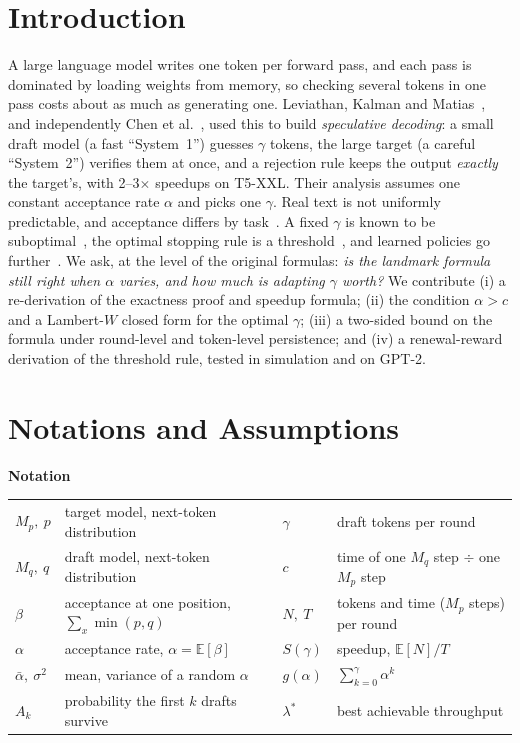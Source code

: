 \documentclass[11pt,letterpaper]{article}
\newcommand{\E}{\mathbb{E}}
\newcommand{\abar}{\bar\alpha}
\newcommand{\lstar}{\lambda^{*}}
\begin{document}
\section{Introduction}
A large language model writes one token per forward pass, and each pass is dominated by loading weights from memory, so checking several tokens in one pass costs about as much as generating one. Leviathan, Kalman and Matias~\cite{leviathan}, and independently Chen et al.~\cite{chen}, used this to build \emph{speculative decoding}: a small draft model (a fast ``System~1'') guesses $\gamma$ tokens, the large target (a careful ``System~2'') verifies them at once, and a rejection rule keeps the output \emph{exactly} the target's, with 2--3$\times$ speedups on T5-XXL. Their analysis assumes one constant acceptance rate $\alpha$ and picks one $\gamma$. Real text is not uniformly predictable, and acceptance differs by task~\cite{abdellatif}. A fixed $\gamma$ is known to be suboptimal~\cite{disco}, the optimal stopping rule is a threshold~\cite{specdecpp}, and learned policies go further~\cite{l2d}. We ask, at the level of the original formulas: \emph{is the landmark formula still right when $\alpha$ varies, and how much is adapting $\gamma$ worth?} We contribute (i) a re-derivation of the exactness proof and speedup formula; (ii) the condition $\alpha>c$ and a Lambert-$W$ closed form for the optimal $\gamma$; (iii) a two-sided bound on the formula under round-level and token-level persistence; and (iv) a renewal-reward derivation of the threshold rule, tested in simulation and on GPT-2.

\section{Notations and Assumptions}
\noindent\textbf{Notation}\par\smallskip
{\small\centering
\begin{tabular}{@{}ll@{\qquad}ll@{}}
$M_p,\ p$ & target model, next-token distribution & $\gamma$ & draft tokens per round\\
$M_q,\ q$ & draft model, next-token distribution & $c$ & time of one $M_q$ step $\div$ one $M_p$ step\\
$\beta$ & acceptance at one position, $\sum_x\min(p,q)$ & $N,\ T$ & tokens and time ($M_p$ steps) per round\\
$\alpha$ & acceptance rate, $\alpha=\E[\beta]$ & $S(\gamma)$ & speedup, $\E[N]/T$\\
$\abar,\ \sigma^2$ & mean, variance of a random $\alpha$ & $g(\alpha)$ & $\sum_{k=0}^{\gamma}\alpha^k$\\
$A_k$ & probability the first $k$ drafts survive & $\lstar$ & best achievable throughput\\
\end{tabular}\par}
\end{document}
